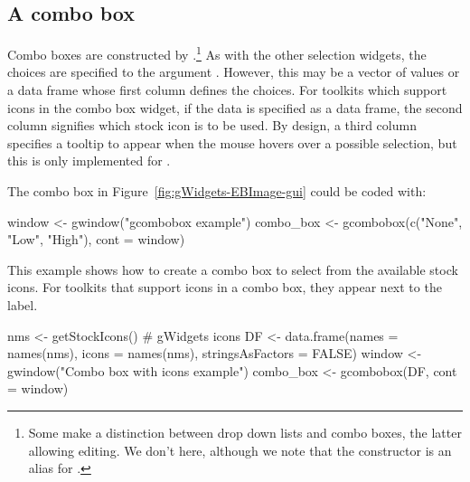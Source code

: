 



\subsection{A combo box}
\label{sec:gWidgets-combobox}

Combo boxes are constructed by .\footnote{Some
  make a distinction between drop down lists and combo boxes, the
  latter allowing editing. We don't here, although we note that the
  constructor  is an alias for
  .}  As with the other selection widgets, the choices
  are specified to the argument . However,
  this may be a vector of values or a data frame whose first column
  defines the choices. For toolkits which support icons in the combo
  box widget, if the data is specified as a data frame, the second
  column signifies which stock icon is to be used. By design, a third
  column specifies a tooltip to appear when the mouse hovers over a
  possible selection, but this is only implemented for
  .


The combo box in Figure~\ref{fig:gWidgets-EBImage-gui} could be coded with:
\begin{Schunk}
\begin{Sinput}
 window <- gwindow("gcombobox example")
 combo_box <- gcombobox(c("None", "Low", "High"), cont = window)
\end{Sinput}
\end{Schunk}



This example shows how to create a combo box to select from the
available stock icons. For toolkits that support icons in a combo box, they
appear next to the label.
\begin{Schunk}
\begin{Sinput}
 nms <- getStockIcons()                  # gWidgets icons
 DF <- data.frame(names = names(nms), icons = names(nms), 
                  stringsAsFactors = FALSE)
 window <- gwindow("Combo box with icons example")
 combo_box <- gcombobox(DF, cont = window)
\end{Sinput}
\end{Schunk}


